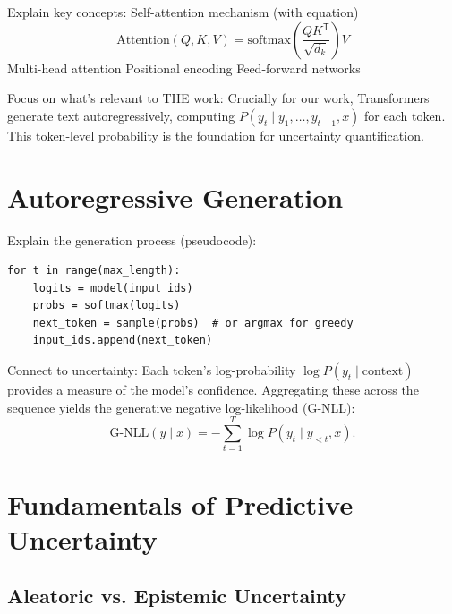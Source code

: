 \documentclass[a4paper,oneside,10pt,ngerman,english]{scrbook}
\begin{document}
Explain key concepts:
Self-attention mechanism (with equation)
\begin{equation}
\mathrm{Attention}(Q,K,V) = \mathrm{softmax}\left(\frac{QK^{\mathsf{T}}}{\sqrt{d_k}}\right)V
\end{equation}
Multi-head attention
Positional encoding
Feed-forward networks

Focus on what's relevant to THE work:
Crucially for our work, Transformers generate text autoregressively, computing $P(y_t \mid y_1,\dots,y_{t-1}, x)$ for each token. This token-level probability is the foundation for uncertainty quantification.
\section{Autoregressive Generation}
Explain the generation process (pseudocode):
\begin{verbatim}
for t in range(max_length):
    logits = model(input_ids)
    probs = softmax(logits)
    next_token = sample(probs)  # or argmax for greedy
    input_ids.append(next_token)
\end{verbatim}

Connect to uncertainty:
Each token's log-probability $\log P(y_t\mid\text{context})$ provides a measure of the model's confidence. Aggregating these across the sequence yields the generative negative log-likelihood (G-NLL):
\begin{equation}
\mathrm{G\mbox{-}NLL}(y\mid x) = -\sum_{t=1}^{T} \log P\left(y_t\mid y_{<t}, x\right).
\end{equation}

\section{Fundamentals of Predictive Uncertainty}

\subsection{Aleatoric vs. Epistemic Uncertainty}
\end{document}
